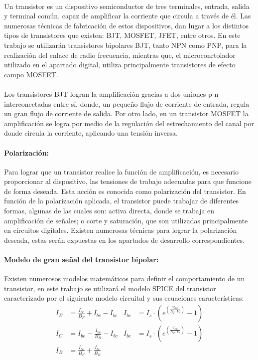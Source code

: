 \paragraph{}
Un transistor es un dispositivo semiconductor de tres terminales, entrada, salida y terminal común, capaz de amplificar la corriente que circula a través de él. 
Las numerosas técnicas de fabricación de estos dispositivos, dan lugar a los distintos tipos de transistores que existen: BJT, MOSFET, JFET, entre otros.
En este trabajo se utilizarán transistores bipolares BJT, tanto NPN como PNP, para la realización del enlace de radio frecuencia, mientras que, el microconrtolador utilizado en el apartado digital, utiliza principalmente transistores de efecto campo MOSFET.
\paragraph{}
Los transistores BJT logran la amplificación gracias a dos uniones p-n interconectadas entre sí, donde, un pequeño flujo de corriente de entrada, regula un gran flujo de corriente de salida. Por otro lado, en un transistor MOSFET la amplificación se logra por medio de la regulación del estrechamiento del canal por donde circula la corriente, aplicando una tensión inversa.
\paragraph{Polarizaci\'on:}
Para lograr que un transistor realice la función de amplificación, es necesario proporcionar al dispositivo, las tensiones de trabajo adecuadas para que funcione de forma deseada. Esta acci\'on es conocida como polarizaci\'on del transistor.
En función de la polarización aplicada, el transistor puede trabajar de diferentes formas, algunas de las cuales son: activa directa, donde se trabaja en amplificación de señales; o corte y saturación, que son utilizadas principalmente en circuitos digitales.
Existen numerosas técnicas para lograr la polarización deseada, estas serán expuestas en los apartados de desarrollo correspondientes.

\paragraph{Modelo de gran señal del transistor bipolar:}
Existen numerosos modelos matemáticos para definir el comportamiento de un transistor, en este trabajo se utilizará el modelo SPICE del transistor caracterizado por el siguiente modelo circuital y sus ecuaciones características:
\begin{align*} 
   I_E &= \frac { I_{be} }{ B_F } + I_{be} - I_{bc}   & I_{be} &= I_s \cdot \left(e^{\left(\frac {V_{BE}}{N_{T} \cdot V_t} \right)} - 1\right)\\
   I_C &= I_{be} - \frac{I_{bc}}{B_R} - I_{bc}  & I_{bc} &= I_s \cdot \left(e^{\left(\frac {V_{BC}}{N_{T} \cdot V_t} \right)} - 1\right)\\
   I_B &= \frac{I_{be}}{B_F} + \frac{I_{bc}}{B_R} 
\end{align*}

